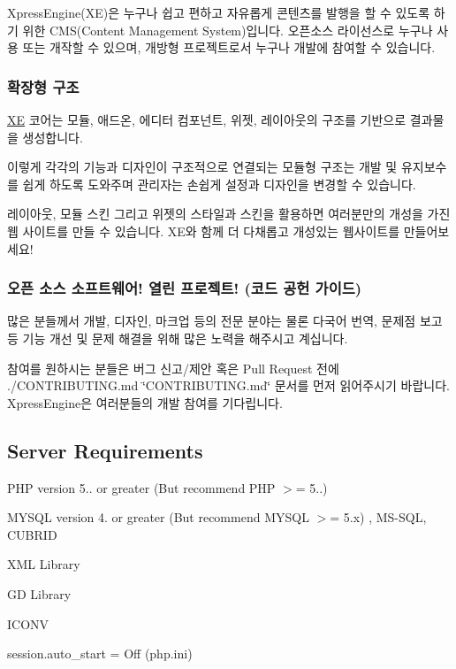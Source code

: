 \href{https://travis-ci.org/xpressengine/xe-core}{\tt } \href{http://www.gnu.org/licenses/gpl.html}{\tt } \href{https://github.com/xpressengine/xe-core/releases}{\tt }

Xpress\+Engine(\+X\+E)은 누구나 쉽고 편하고 자유롭게 콘텐츠를 발행을 할 수 있도록 하기 위한 C\+M\+S(\+Content Management System)입니다. 오픈소스 라이선스로 누구나 사용 또는 개작할 수 있으며, 개방형 프로젝트로서 누구나 개발에 참여할 수 있습니다.

\subsubsection*{확장형 구조}

\hyperlink{namespaceXE}{XE} 코어는 모듈, 애드온, 에디터 컴포넌트, 위젯, 레이아웃의 구조를 기반으로 결과물을 생성합니다.

이렇게 각각의 기능과 디자인이 구조적으로 연결되는 모듈형 구조는 개발 및 유지보수를 쉽게 하도록 도와주며 관리자는 손쉽게 설정과 디자인을 변경할 수 있습니다.

레이아웃, 모듈 스킨 그리고 위젯의 스타일과 스킨을 활용하면 여러분만의 개성을 가진 웹 사이트를 만들 수 있습니다. X\+E와 함께 더 다채롭고 개성있는 웹사이트를 만들어보세요!

\subsubsection*{오픈 소스 소프트웨어! 열린 프로젝트! (코드 공헌 가이드)}

많은 분들께서 개발, 디자인, 마크업 등의 전문 분야는 물론 다국어 번역, 문제점 보고 등 기능 개선 및 문제 해결을 위해 많은 노력을 해주시고 계십니다.

참여를 원하시는 분들은 버그 신고/제안 혹은 Pull Request 전에 ./\+C\+O\+N\+T\+R\+I\+B\+U\+T\+I\+NG.md \char`\"{}\+C\+O\+N\+T\+R\+I\+B\+U\+T\+I\+N\+G.\+md\char`\"{} 문서를 먼저 읽어주시기 바랍니다. Xpress\+Engine은 여러분들의 개발 참여를 기다립니다.

\subsection*{Server Requirements}


\begin{DoxyItemize}
\item P\+HP version 5.. or greater (But recommend P\+HP $>$= 5..)
\item M\+Y\+S\+QL version 4. or greater (But recommend M\+Y\+S\+QL $>$= 5.\+x) , M\+S-\/\+S\+QL, C\+U\+B\+R\+ID
\item X\+ML Library
\item GD Library
\item I\+C\+O\+NV
\item session.\+auto\+\_\+start = Off (php.\+ini)
\end{DoxyItemize}

